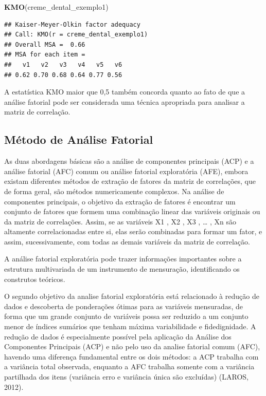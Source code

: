 \documentclass[12pt,brazil,]{book}
\newenvironment{Shaded}{\begin{snugshade}}{\end{snugshade}}
\newcommand{\KeywordTok}[1]{\textcolor[rgb]{0.13,0.29,0.53}{\textbf{#1}}}
\newcommand{\NormalTok}[1]{#1}
\begin{document}
\begin{Shaded}
\begin{Highlighting}[]
\KeywordTok{KMO}\NormalTok{(creme_dental_exemplo1)}
\end{Highlighting}
\end{Shaded}

\begin{verbatim}
## Kaiser-Meyer-Olkin factor adequacy
## Call: KMO(r = creme_dental_exemplo1)
## Overall MSA =  0.66
## MSA for each item = 
##   v1   v2   v3   v4   v5   v6 
## 0.62 0.70 0.68 0.64 0.77 0.56
\end{verbatim}

A estatística KMO maior que 0,5 também concorda quanto ao fato de que a
análise fatorial pode ser considerada uma técnica apropriada para
analisar a matriz de correlação.

\hypertarget{metodo-de-analise-fatorial}{%
\subsection{Método de Análise
Fatorial}\label{metodo-de-analise-fatorial}}

As duas abordagens básicas são a análise de componentes principais (ACP)
e a análise fatorial (AFC) comum ou análise fatorial exploratória (AFE),
embora existam diferentes métodos de extração de fatores da matriz de
correlações, que de forma geral, são métodos numericamente complexos. Na
análise de componentes principais, o objetivo da extração de fatores é
encontrar um conjunto de fatores que formem uma combinação linear das
variáveis originais ou da matriz de correlações. Assim, se as variáveis
X1 , X2 , X3 , \ldots{} , Xn são altamente correlacionadas entre si,
elas serão combinadas para formar um fator, e assim, sucessivamente, com
todas as demais variáveis da matriz de correlação.

A análise fatorial exploratória pode trazer informações importantes
sobre a estrutura multivariada de um instrumento de mensuração,
identificando os construtos teóricos.

O segundo objetivo da analise fatorial exploratória está relacionado à
redução de dados e descoberta de ponderações ótimas para as variáveis
mensuradas, de forma que um grande conjunto de variáveis possa ser
reduzido a um conjunto menor de índices sumários que tenham máxima
variabilidade e fidedignidade. A redução de dados é especialmente
possível pela aplicação da Análise dos Componentes Principais (ACP) e
não pelo uso da analise fatorial comum (AFC), havendo uma diferença
fundamental entre os dois métodos: a ACP trabalha com a variância total
observada, enquanto a AFC trabalha somente com a variância partilhada
dos itens (variância erro e variância única são excluídas) (LAROS,
2012).
\end{document}
